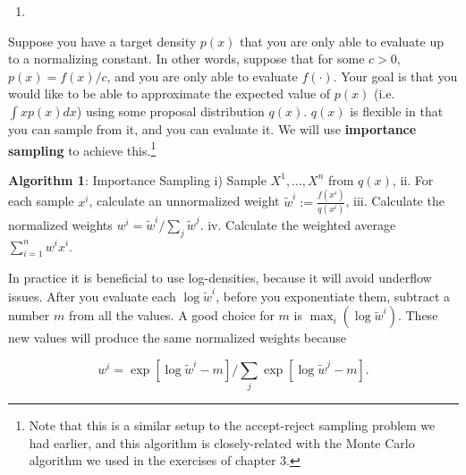 \documentclass[
  12pt,
  krantz2]{krantz}
\providecommand{\tightlist}{%
  \setlength{\itemsep}{0pt}\setlength{\parskip}{0pt}}
\begin{document}
\begin{enumerate}
\def\labelenumi{\arabic{enumi}.}
\setcounter{enumi}{9}
\tightlist
\item
\end{enumerate}

Suppose you have a target density \(p(x)\) that you are only able to evaluate up to a normalizing constant. In other words, suppose that for some \(c > 0\), \(p(x) = f(x) / c\), and you are only able to evaluate \(f(\cdot)\). Your goal is that you would like to be able to approximate the expected value of \(p(x)\) (i.e.~\(\int x p(x) dx\)) using some proposal distribution \(q(x)\). \(q(x)\) is flexible in that you can sample from it, and you can evaluate it. We will use \textbf{importance sampling} \citep{impsamping1} \citep{impsamping2} to achieve this.\footnote{Note that this is a similar setup to the accept-reject sampling problem we had earlier, and this algorithm is closely-related with the Monte Carlo algorithm we used in the exercises of chapter 3.}

\textbf{Algorithm 1}: Importance Sampling
i) Sample \(X^1, \ldots, X^n\) from \(q(x)\),
ii. For each sample \(x^i\), calculate an unnormalized weight \(\tilde{w}^i:= \frac{f(x^i)}{q(x^i)}\),
iii. Calculate the normalized weights \(w^i = \tilde{w}^i \bigg/ \sum_j \tilde{w}^j\).
iv. Calculate the weighted average \(\sum_{i=1}^n w^i x^i\).

In practice it is beneficial to use log-densities, because it will avoid underflow issues. After you evaluate each \(\log \tilde{w}^i\), before you exponentiate them, subtract a number \(m\) from all the values. A good choice for \(m\) is \(\max_i (\log \tilde{w}^i)\). These new values will produce the same normalized weights because

\begin{equation} 
w^i = \exp[ \log \tilde{w}^i - m] \bigg/ \sum_j \exp[\log \tilde{w}^j - m].
\end{equation}
\end{document}
